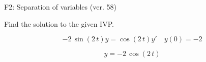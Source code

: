 \begin{exercise}
  \begin{exerciseTitle}F2: Separation of variables (ver. 58)\end{exerciseTitle}
  \begin{exerciseStatement}
    
Find the solution to the given IVP.

    
\[-2 \, \sin\left(2 \, t\right) y= \cos\left(2 \, t\right) y'\hspace{1em} y\left( 0 \right)= -2\]

  \end{exerciseStatement}
  \begin{exerciseAnswer}
    
\[y= -2 \, \cos\left(2 \, t\right)\]

  \end{exerciseAnswer}
\end{exercise}